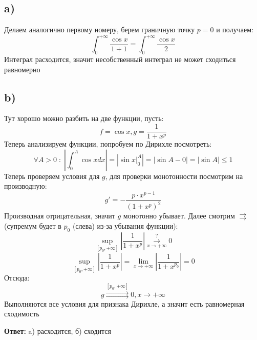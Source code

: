 \documentclass[a4paper,12pt]{article}
\begin{document}
\subsection*{a)}
Делаем аналогично первому номеру, берем граничную точку $p = 0$ и получаем:
\[
\int_0^{+\infty} \frac{\cos x }{1 + 1} = \int_0^{+\infty} \frac{\cos x }{2}
\]
Интеграл расходится, значит несобственный интеграл не может сходиться равномерно
\subsection*{b)}
Тут хорошо можно разбить на две функции, пусть:
\[
f = \cos x, g = \frac{1}{1 + x^p}
\]
Теперь анализируем функции, попробуем по Дирихле посмотреть:
\[
\forall A > 0 \; : \; 
\left|
\int_0^A \cos x dx 
\right|
=
\left|
\sin x \Bigg|_0^A
\right|
=
\left|
\sin A - 0 
\right|
=
\left|
\sin A
\right|
\leq 1 
\]
Теперь проверяем условия для $g$, для проверки монотонности посмотрим на производную:
\[
g' = - \frac{p \cdot x^{p - 1}}{(1 + x^p)^2}
\]
Производная отрицательная, значит $g$ монотонно убывает. Далее смотрим $\rightrightarrows$ (супремум будет в $p_0$ (слева) из-за убывания функции):
\[
\underset{[p_0, +\infty]}{\sup} \left| \frac{1}{1 + x^p }\right| \overset{?}{\underset{x \rightarrow +\infty}{\longrightarrow}}  0
\]
\[
\underset{[p_0, +\infty]}{\sup} \left| \frac{1}{1 + x^p }\right| = \lim_{
x \rightarrow +\infty}
\left|
\frac{1}{1 + x^{p_0}}
\right|
=
0
\]
Отсюда:
\[
g \overset{[p_0, +\infty]}{\rightrightarrows }0, x \rightarrow +\infty
\]
Выполняются все условия для признака Дирихле, а значит есть равномерная сходимость
\begin{center}
\textbf{Ответ:} a) расходится, б) сходится 
\end{center}

\clearpage
\end{document}
